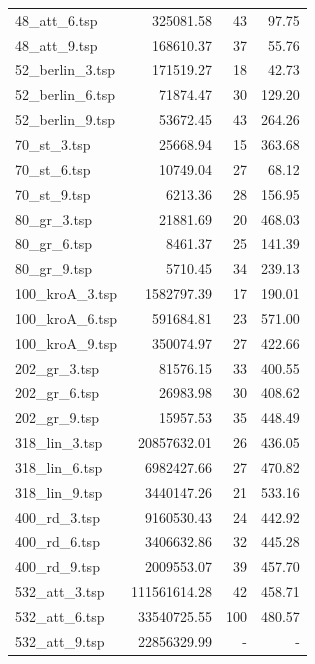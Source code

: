 \begin{table}[H]
\begin{tabular}{|l|r|r|r|}
48\_att\_6.tsp & 325081.58 & 43 & 97.75 \\
48\_att\_9.tsp & 168610.37 & 37 & 55.76 \\
52\_berlin\_3.tsp & 171519.27 & 18 & 42.73 \\
52\_berlin\_6.tsp & 71874.47 & 30 & 129.20 \\
52\_berlin\_9.tsp & 53672.45 & 43 & 264.26 \\
70\_st\_3.tsp & 25668.94 & 15 & 363.68 \\
70\_st\_6.tsp & 10749.04 & 27 & 68.12 \\
70\_st\_9.tsp & 6213.36 & 28 & 156.95 \\
80\_gr\_3.tsp & 21881.69 & 20 & 468.03 \\
80\_gr\_6.tsp & 8461.37 & 25 & 141.39 \\
80\_gr\_9.tsp & 5710.45 & 34 & 239.13 \\
100\_kroA\_3.tsp & 1582797.39 & 17 & 190.01 \\
100\_kroA\_6.tsp & 591684.81 & 23 & 571.00 \\
100\_kroA\_9.tsp & 350074.97 & 27 & 422.66 \\
202\_gr\_3.tsp & 81576.15 & 33 & 400.55 \\
202\_gr\_6.tsp & 26983.98 & 30 & 408.62 \\
202\_gr\_9.tsp & 15957.53 & 35 & 448.49 \\
318\_lin\_3.tsp & 20857632.01 & 26 & 436.05 \\
318\_lin\_6.tsp & 6982427.66 & 27 & 470.82 \\
318\_lin\_9.tsp & 3440147.26 & 21 & 533.16 \\
400\_rd\_3.tsp & 9160530.43 & 24 & 442.92 \\
400\_rd\_6.tsp & 3406632.86 & 32 & 445.28 \\
400\_rd\_9.tsp & 2009553.07 & 39 & 457.70 \\
532\_att\_3.tsp & 111561614.28 & 42 & 458.71 \\
532\_att\_6.tsp & 33540725.55 & 100 & 480.57 \\
532\_att\_9.tsp & 22856329.99 & - & - \\
\hline
\end{tabular}
\end{table}
